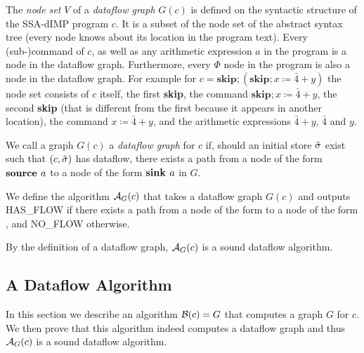 \begin{definition}
    The \emph{node set} $V$ of a \emph{dataflow graph} $G(c)$
    is defined on the syntactic structure
    of the SSA-dIMP program $c$. It is a subset of the node set of the abstract syntax tree
    (every node knows about its location in the program text).
    Every (sub-)command of $c$, as well as any arithmetic expression $a$ in the 
    program is a node in the dataflow graph.
    Furthermore, every $\Phi$ node in the program is also a node in the dataflow
    graph.
    For example for
    $c = \textbf{skip}; (\textbf{skip}; x \coloneqq \bar{4} + y)$
    the node set consists of $c$ itself, the first \textbf{skip}, the command 
    $\textbf{skip}; x \coloneqq \bar{4} + y$, the second \textbf{skip} (that is different 
    from the first because it appears in another location), the command
    $x \coloneqq \bar{4} + y$, and the arithmetic expressions $\bar{4}+y$,
    $\bar{4}$ and $y$.

    We call a graph $G(c)$ a \emph{dataflow graph} for $c$ if, should an initial store
    $\tilde{\sigma}{}$ exist such that $(c, \tilde{\sigma}{})$ has dataflow,
    there exists a path from a node of the form $\textbf{source }{a}$ to a node of 
    the form $\textbf{sink }{a}$ in $G$.
\end{definition}

\begin{definition}
    We define the algorithm $\operatorname{\mathcal{A}}_{G}(c)$ that takes a dataflow graph $G(c)$
    and outputs HAS\_FLOW if there exists a path from a node of the form 
    to a node of the form , and NO\_FLOW otherwise.
\end{definition}
\begin{remark}
    By the definition of a dataflow graph, $\operatorname{\mathcal{A}}_G(c)$ is a sound dataflow algorithm.
\end{remark}

\subsection{A Dataflow Algorithm}
In this section we describe an algorithm $\operatorname{\mathcal{B}}(c) = G$ that computes a 
graph $G$ for $c$. We then prove that this algorithm indeed
computes a dataflow graph and thus $\operatorname{\mathcal{A}}_G(c)$ is a sound dataflow algorithm.


